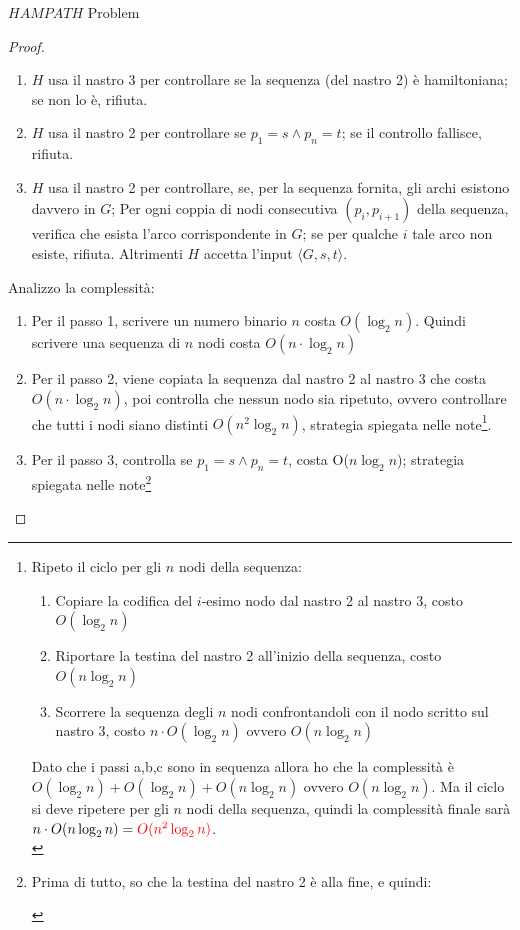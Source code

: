 \documentclass{article}  %
\theoremstyle{definition}
\begin{document}
\begin{theorem}{$HAMPATH$ Problem}
\begin{proof}
\begin{enumerate}
			\item $H$ usa il nastro 3 per controllare se la sequenza (del nastro 2) è hamiltoniana; se non lo è, rifiuta.
			\item $H$ usa il nastro 2 per controllare se $p_1=s \land p_n=t$; se il controllo fallisce, rifiuta.
			\item $H$ usa il nastro 2 per controllare, se, per la sequenza fornita, gli archi esistono davvero in $G$;
			      Per ogni coppia di nodi consecutiva $(p_i, p_{i+1})$ della sequenza, verifica che esista l'arco corrispondente in $G$; se
			      per qualche $i$ tale arco non esiste, rifiuta. Altrimenti $H$ accetta l'input $\langle G,s,t \rangle$.
		\end{enumerate}
		Analizzo la complessità:
		\begin{enumerate}
			\item Per il passo 1, scrivere un numero binario $n$ costa $O(\log_2n)$. Quindi scrivere una sequenza di $n$ nodi costa $O(n \cdot \log_2n)$
			\item Per il passo 2, viene copiata la sequenza dal nastro 2 al nastro 3 che costa $O(n \cdot \log_2n)$, poi controlla che nessun nodo
			      sia ripetuto, ovvero controllare che tutti i nodi siano distinti $O(n^2\log_2n)$, strategia spiegata nelle note\footnote{
				      Ripeto il ciclo per gli $n$ nodi della sequenza:
				      \begin{enumerate}
					      \item Copiare la codifica del $i$-esimo nodo dal nastro 2 al nastro 3, costo $O(\log_2n)$
					      \item Riportare la testina del nastro 2 all'inizio della sequenza, costo $O(n\log_2n)$
					      \item Scorrere la sequenza degli $n$ nodi confrontandoli con il nodo scritto sul nastro 3, costo $n\cdot O(\log_2n)$ ovvero $O(n \log_2n)$
				      \end{enumerate}
				      Dato che i passi a,b,c sono in sequenza allora ho che la complessità è $O(\log_2n)+O(\log_2n)+O(n\log_2n)$ ovvero $O(n\log_2n)$. Ma il ciclo
				      si deve ripetere per gli $n$ nodi della sequenza, quindi la complessità finale sarà $n\cdot O(n\log_2n)=\textcolor{red}{O(n^2\log_2n)}$. \\
			      }.
			\item Per il passo 3, controlla se $p_1=s \land p_n=t$, costa O($n\log_2n$); strategia spiegata nelle note\footnote{
				      Prima di tutto, so che la testina del nastro 2 è alla fine, e quindi:
				      \begin{enumerate}

\end{enumerate}}
\end{enumerate}
\end{proof}
\end{theorem}
\end{document}
